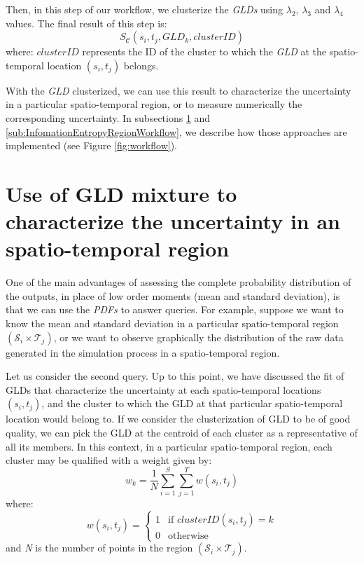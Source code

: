 Then, in this step of our workflow, we clusterize the \textit{GLDs} using $\lambda_{2}$, $\lambda_{3}$ and $\lambda_{4}$ values. The final result of this step is:
\begin{equation}
S_{\mathcal{C}}(s_{i},t_{j},GLD_{k},clusterID)
\end{equation}
where:
$clusterID$ represents the ID of the cluster to which the \textit{GLD} at the spatio-temporal location $(s_{i},t_{j})$ belongs.

With the \textit{GLD} clusterized, we can use this result to characterize the uncertainty in a particular spatio-temporal region, or to measure numerically the corresponding uncertainty. In subsections \ref{sub:gldMixtureWorkflow} and \ref{sub:InfomationEntropyRegionWorkflow}, we describe how those approaches are implemented (see Figure \ref{fig:workflow}).

\section{Use of GLD mixture to characterize the uncertainty in an spatio-temporal region}
\label{sub:gldMixtureWorkflow}
One of the main advantages of assessing the complete probability distribution of the outputs, in place of low order moments (mean and standard deviation), is that we can use the \textit{PDFs} to answer queries. For example, suppose we want to know the mean and standard deviation in a particular spatio-temporal region $(\mathcal{S}_{i} \times \mathcal{T}_{j})$, or we want to observe graphically the distribution of the raw data generated in the simulation process in a spatio-temporal region. 


Let us consider the second query. Up to this point, we have discussed the fit of GLDs that characterize the uncertainty at each spatio-temporal locations $(s_{i},t_{j})$, and the cluster to which the GLD at that particular spatio-temporal location would belong to. If we consider the clusterization of GLD to be of good quality, we can pick the GLD at the centroid of each cluster as a representative of all its members. In this context, in a particular spatio-temporal region, each cluster may be qualified with a weight given by:
\begin{equation}
w_{k}=\frac{1}{N}\sum_{i=1}^S \sum_{j=1}^T w(s_{i},t_{j})
\end{equation}
where:
\begin{equation}
  w(s_{i},t_{j}) =
  \begin{cases}
    1 & \text{if $clusterID(s_{i},t_{j}) = k$} \\
    0 & \text{otherwise}
  \end{cases}
\end{equation}
and  \textit{N} is the number of points in the region $(\mathcal{S}_{i} \times \mathcal{T}_{j})$.

